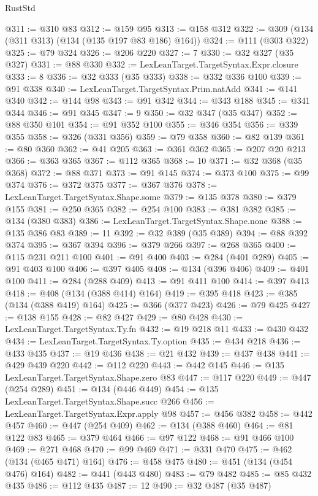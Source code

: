 \begin{lexlean}{RustStd}
\begin{coremodule}
@311 := @310 @83
@312 := @159 @95
@313 := @158 @312
@322 := @309 (@134 (@311 @313) (@134 (@135 @197 @83 @186) @164))
@324 := @111 (@303 @322)
@325 := @79 @324
@326 := @206 @220
@327 := 7
@330 := @32 @327 (@35 @327)
@331 := @88 @330
@332 := LexLeanTarget.TargetSyntax.Expr.closure
@333 := 8
@336 := @32 @333 (@35 @333)
@338 := @332 @336 @100
@339 := @91 @338
@340 := LexLeanTarget.TargetSyntax.Prim.natAdd
@341 := @141 @340
@342 := @144 @98
@343 := @91 @342
@344 := @343 @188
@345 := @341 @344
@346 := @91 @345
@347 := 9
@350 := @32 @347 (@35 @347)
@352 := @88 @350 @101
@354 := @91 @352 @100
@355 := @346 @354
@356 := @339 @355
@358 := @326 (@331 @356)
@359 := @79 @358
@360 := @82 @139
@361 := @80 @360
@362 := @41 @205
@363 := @361 @362
@365 := @207 @20 @213
@366 := @363 @365
@367 := @112 @365
@368 := 10
@371 := @32 @368 (@35 @368)
@372 := @88 @371
@373 := @91 @145
@374 := @373 @100
@375 := @99 @374
@376 := @372 @375
@377 := @367 @376
@378 := LexLeanTarget.TargetSyntax.Shape.some
@379 := @135 @378
@380 := @379 @155
@381 := @250 @365
@382 := @254 @100
@383 := @381 @382
@385 := @134 (@380 @383)
@386 := LexLeanTarget.TargetSyntax.Shape.none
@388 := @135 @386 @83
@389 := 11
@392 := @32 @389 (@35 @389)
@394 := @88 @392 @374
@395 := @367 @394
@396 := @379 @266
@397 := @268 @365
@400 := @115 @231 @211 @100
@401 := @91 @400
@403 := @284 (@401 @289)
@405 := @91 @403 @100
@406 := @397 @405
@408 := @134 (@396 @406)
@409 := @401 @100
@411 := @284 (@288 @409)
@413 := @91 @411 @100
@414 := @397 @413
@418 := @408 (@134 (@388 @414) @164)
@419 := @395 @418
@423 := @385 (@134 (@388 @419) @164)
@425 := @366 (@377 @423)
@426 := @79 @425
@427 := @138 @155
@428 := @82 @427
@429 := @80 @428
@430 := LexLeanTarget.TargetSyntax.Ty.fn
@432 := @19 @218 @11
@433 := @430 @432
@434 := LexLeanTarget.TargetSyntax.Ty.option
@435 := @434 @218
@436 := @433 @435
@437 := @19 @436
@438 := @21 @432
@439 := @437 @438
@441 := @429 @439 @220
@442 := @112 @220
@443 := @442 @145
@446 := @135 LexLeanTarget.TargetSyntax.Shape.zero @83
@447 := @117 @220
@449 := @447 (@254 @289)
@451 := @134 (@446 @449)
@454 := @135 LexLeanTarget.TargetSyntax.Shape.succ @266
@456 := LexLeanTarget.TargetSyntax.Expr.apply @98
@457 := @456 @382
@458 := @442 @457
@460 := @447 (@254 @409)
@462 := @134 (@388 @460)
@464 := @81 @122 @83
@465 := @379 @464
@466 := @97 @122
@468 := @91 @466 @100
@469 := @271 @468
@470 := @99 @469
@471 := @331 @470
@475 := @462 (@134 (@465 @471) @164)
@476 := @458 @475
@480 := @451 (@134 (@454 @476) @164)
@482 := @441 (@443 @480)
@483 := @79 @482
@485 := @85 @432 @435
@486 := @112 @435
@487 := 12
@490 := @32 @487 (@35 @487)

\end{coremodule}
\end{lexlean}

